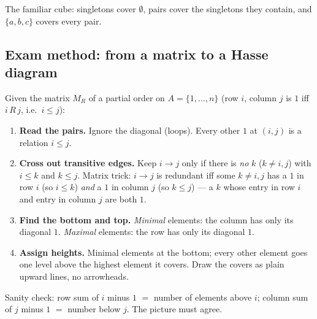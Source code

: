 \documentclass{fkt-notes}
\theoremstyle{definition}
\begin{document}
\begin{example}
  The familiar cube: singletons cover $\emptyset$, pairs cover the
  singletons they contain, and $\{a,b,c\}$ covers every pair.
  \begin{center}
  \end{center}
\end{example}

\subsection{Exam method: from a matrix to a Hasse diagram}
%
Given the matrix $M_R$ of a partial order on $A=\{1,\dots,n\}$ (row $i$,
column $j$ is $1$ iff $i\,R\,j$, i.e.\ $i\le j$):

\begin{rulepar}
  \begin{enumerate}[nosep]
    \item \textbf{Read the pairs.} Ignore the diagonal (loops). Every
          other $1$ at $(i,j)$ is a relation $i\le j$.
    \item \textbf{Cross out transitive edges.} Keep $i\to j$ only if
          there is \emph{no} $k$ ($k\ne i,j$) with $i\le k$ and $k\le j$.
          Matrix trick: $i\to j$ is redundant iff some $k\ne i,j$ has a
          $1$ in row $i$ (so $i\le k$) \emph{and} a $1$ in column $j$ (so
          $k\le j$) --- a $k$ whose entry in row $i$ and entry in column
          $j$ are both $1$.
    \item \textbf{Find the bottom and top.} \emph{Minimal} elements: the
          column has only its diagonal $1$. \emph{Maximal} elements: the
          row has only its diagonal $1$.
    \item \textbf{Assign heights.} Minimal elements at the bottom; every
          other element goes one level above the highest element it
          covers. Draw the covers as plain upward lines, no arrowheads.
  \end{enumerate}
  Sanity check: row sum of $i$ minus $1$ $=$ number of elements above $i$;
  column sum of $j$ minus $1$ $=$ number below $j$. The picture must agree.
\end{rulepar}
\end{document}
